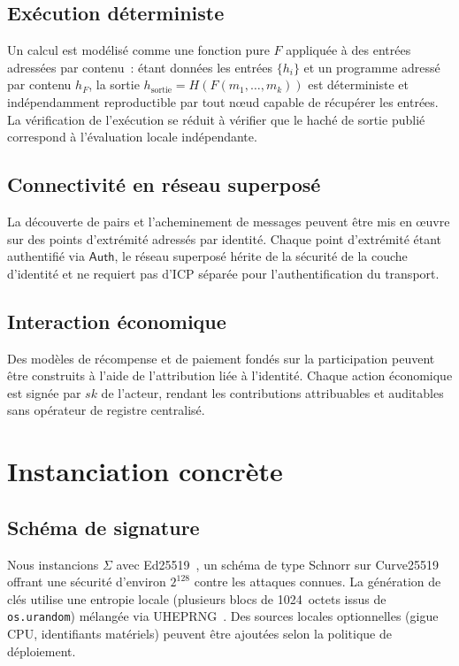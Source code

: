 \documentclass[11pt,a4paper]{article}
\begin{document}
\subsection{Exécution déterministe}

Un calcul est modélisé comme une fonction pure $F$ appliquée à des entrées
adressées par contenu~: étant données les entrées $\{h_i\}$ et un programme
adressé par contenu $h_F$, la sortie $h_{\mathrm{sortie}} = H(F(m_1,
\ldots, m_k))$ est déterministe et indépendamment reproductible par tout
n\oe{}ud capable de récupérer les entrées.  La vérification de l'exécution
se réduit à vérifier que le haché de sortie publié correspond à l'évaluation
locale indépendante.

\subsection{Connectivité en réseau superposé}

La découverte de pairs et l'acheminement de messages peuvent être mis en
\oe{}uvre sur des points d'extrémité adressés par identité.  Chaque point
d'extrémité étant authentifié via $\mathsf{Auth}$, le réseau superposé
hérite de la sécurité de la couche d'identité et ne requiert pas d'ICP
séparée pour l'authentification du transport.

\subsection{Interaction économique}

Des modèles de récompense et de paiement fondés sur la participation peuvent
être construits à l'aide de l'attribution liée à l'identité.  Chaque action
économique est signée par $sk$ de l'acteur, rendant les contributions
attribuables et auditables sans opérateur de registre centralisé.

\section{Instanciation concrète}
\label{sec:instanciation}

\subsection{Schéma de signature}

Nous instancions $\Sigma$ avec Ed25519~\cite{eddsa}, un schéma de type
Schnorr sur Curve25519 offrant une sécurité d'environ $2^{128}$ contre les
attaques connues. La génération de clés utilise une entropie locale
(plusieurs blocs de 1024~octets issus de \texttt{os.urandom}) mélangée
via UHEPRNG~\cite{uheprng}. Des sources locales optionnelles (gigue CPU,
identifiants matériels) peuvent être ajoutées selon la politique de déploiement.
\end{document}

